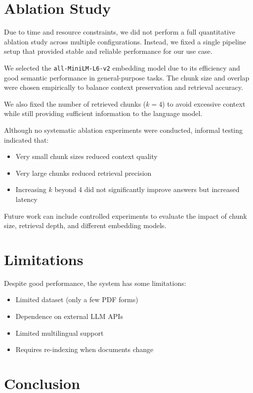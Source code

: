 \documentclass[11pt,a4paper]{article}
\begin{document}
\section{Ablation Study}

Due to time and resource constraints, we did not perform a full quantitative ablation study across multiple configurations. Instead, we fixed a single pipeline setup that provided stable and reliable performance for our use case.

We selected the \texttt{all-MiniLM-L6-v2} embedding model due to its efficiency and good semantic performance in general-purpose tasks. The chunk size and overlap were chosen empirically to balance context preservation and retrieval accuracy.

We also fixed the number of retrieved chunks ($k=4$) to avoid excessive context while still providing sufficient information to the language model.

Although no systematic ablation experiments were conducted, informal testing indicated that:
\begin{itemize}
    \item Very small chunk sizes reduced context quality
    \item Very large chunks reduced retrieval precision
    \item Increasing $k$ beyond 4 did not significantly improve answers but increased latency
\end{itemize}

Future work can include controlled experiments to evaluate the impact of chunk size, retrieval depth, and different embedding models.

\section{Limitations}

Despite good performance, the system has some limitations:
\begin{itemize}
    \item Limited dataset (only a few PDF forms)
    \item Dependence on external LLM APIs
    \item Limited multilingual support
    \item Requires re-indexing when documents change
\end{itemize}

\section{Conclusion}
\end{document}
